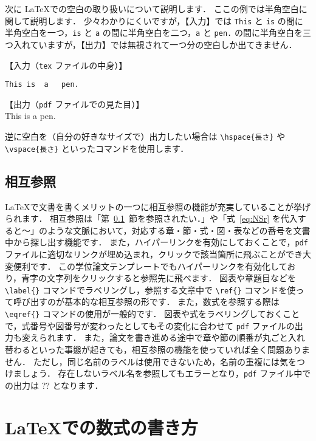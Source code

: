 次に \LaTeX での空白の取り扱いについて説明します．
ここの例では半角空白に関して説明します．
少々わかりにくいですが，【入力】では \verb|This| と \verb|is| の間に半角空白を一つ，\verb|is| と \verb|a| の間に半角空白を二つ，\verb|a| と \verb|pen.| の間に半角空白を三つ入れていますが，【出力】では無視されて一つ分の空白しか出てきません．

\begin{tcolorbox}[title={空白の処理}]
【入力（\verb|tex| ファイルの中身）】
\begin{verbatim}
This is  a   pen.
\end{verbatim}
\tcblower
【出力（\verb|pdf| ファイルでの見た目）】\\
This is a pen.
\end{tcolorbox}

逆に空白を（自分の好きなサイズで）出力したい場合は \verb|\hspace{長さ}| や \verb|\vspace{長さ}| といったコマンドを使用します．

\subsection{相互参照}
\label{ssec:ref}

\LaTeX で文書を書くメリットの一つに相互参照の機能が充実していることが挙げられます．
相互参照は「第~\ref{ssec:ref}~節を参照されたい．」や「式~\eqref{eq:NSr} を代入すると～」のような文脈において，対応する章・節・式・図・表などの番号を文書中から探し出す機能です．
また，ハイパーリンクを有効にしておくことで，\verb|pdf| ファイルに適切なリンクが埋め込まれ，クリックで該当箇所に飛ぶことができ大変便利です．
この学位論文テンプレートでもハイパーリンクを有効化しており，青字の文字列をクリックすると参照先に飛べます．
図表や章題目などを \verb|\label{}| コマンドでラベリングし，参照する文章中で \verb|\ref{}| コマンドを使って呼び出すのが基本的な相互参照の形です．
また，数式を参照する際は \verb|\eqref{}| コマンドの使用が一般的です．
図表や式をラベリングしておくことで，式番号や図番号が変わったとしてもその変化に合わせて \verb|pdf| ファイルの出力も変えられます．
また，論文を書き進める途中で章や節の順番が丸ごと入れ替わるといった事態が起きても，相互参照の機能を使っていれば全く問題ありません．
ただし，同じ名前のラベルは使用できないため，名前の重複には気をつけましょう．
存在しないラベル名を参照してもエラーとなり，\verb|pdf| ファイル中での出力は ?? となります．


\section{\LaTeX での数式の書き方}
\label{sec:formula_in_LaTeX}


